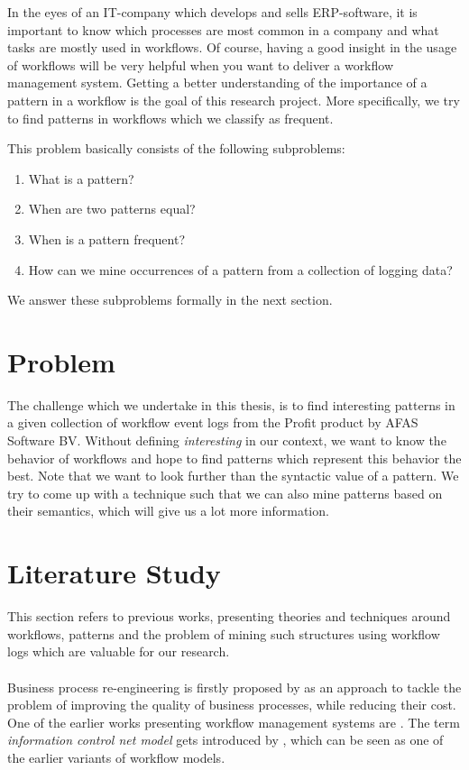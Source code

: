 \documentclass[a4paper,11pt]{article}
\begin{document}
In the eyes of an IT-company which develops and sells ERP-software, it is important to know which processes are most common in a company and what tasks are mostly used in workflows. Of course, having a good insight in the usage of workflows will be very helpful when you want to deliver a workflow management system. Getting a better understanding of the importance of a pattern in a workflow is the goal of this research project. More specifically, we try to find patterns in workflows which we classify as frequent.

This problem basically consists of the following subproblems:
\begin{enumerate}
\item What is a pattern?
\item When are two patterns equal?
\item When is a pattern frequent?
\item How can we mine occurrences of a pattern from a collection of logging data?
\end{enumerate}
We answer these subproblems formally in the next section.

\section{Problem}
The challenge which we undertake in this thesis, is to find interesting patterns in a given collection of workflow event logs from the Profit product by AFAS Software BV. Without defining \textit{interesting} in our context, we want to know the behavior of workflows and hope to find patterns which represent this behavior the best. Note that we want to look further than the syntactic value of a pattern. We try to come up with a technique such that we can also mine patterns based on their semantics, which will give us a lot more information. 


\section{Literature Study}
This section refers to previous works, presenting theories and techniques around workflows, patterns and the problem of mining such structures using workflow logs which are valuable for our research.\\
\\
Business process re-engineering is firstly proposed by \cite{Hammer1990} as an approach to tackle the problem of improving the quality of business processes, while reducing their cost. One of the earlier works presenting workflow management systems are \cite{EngelGLT79,Ellis1982}. The term \textit{information control net model} gets introduced by \cite{Ellis1982}, which can be seen as one of the earlier variants of workflow models. 
\end{document}
